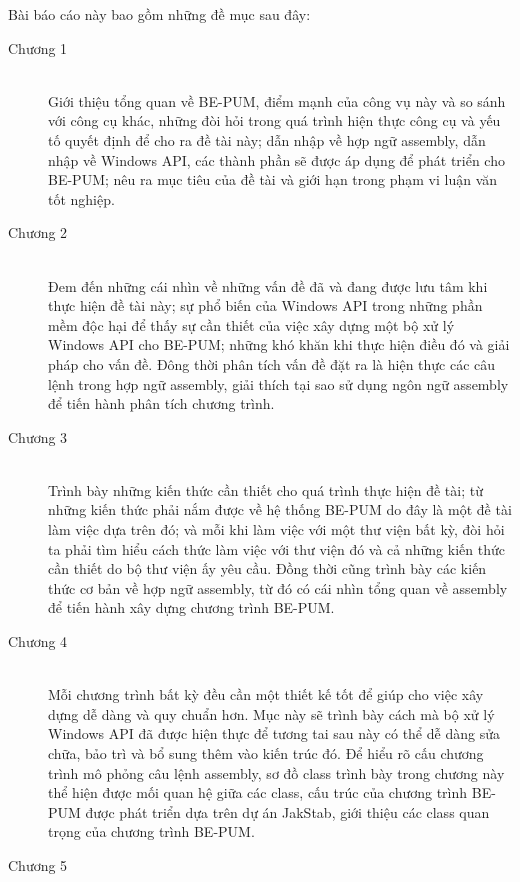 Bài báo cáo này bao gồm những đề mục sau đây:

\begin{description}
  	\item[Chương 1] \hfill \\
	Giới thiệu tổng quan về BE-PUM, điểm mạnh của công vụ này và so sánh với công cụ khác, những đòi hỏi trong quá trình hiện thực công cụ và yếu tố quyết  định để cho ra đề tài này; dẫn nhập về hợp ngữ assembly, dẫn nhập về Windows API, các thành phần sẽ được áp dụng để phát triển cho BE-PUM; nêu ra mục tiêu của đề tài và giới hạn trong phạm vi luận văn tốt nghiệp. \\
 	\item[Chương 2] \hfill \\
	Đem đến những cái nhìn về những vấn đề đã và đang được lưu tâm khi thực hiện đề tài này; sự phổ biến của Windows API trong những phần mềm độc hại để thấy sự cần thiết của việc xây dựng một bộ xử lý Windows API cho BE-PUM; những khó khăn khi thực hiện điều đó và giải pháp cho vấn đề. Đông thời phân tích vấn đề đặt ra là hiện thực các câu lệnh trong hợp ngữ assembly, giải thích tại sao sử dụng ngôn ngữ assembly để tiến hành phân tích chương trình.\\
	\item[Chương 3] \hfill \\
	Trình bày những kiến thức cần thiết cho quá trình thực hiện đề tài; từ những kiến thức phải nắm được về hệ thống BE-PUM do đây là một đề tài làm việc dựa trên đó; và mỗi khi làm việc với một thư viện bất kỳ, đòi hỏi ta phải tìm hiểu cách thức làm việc với thư viện đó và cả những kiến thức cần thiết do bộ thư viện ấy yêu cầu. Đồng thời cũng trình bày các kiến thức cơ bản về hợp ngữ assembly, từ đó có cái nhìn tổng quan về assembly để tiến hành xây dựng chương trình BE-PUM. \\
	\item[Chương 4] \hfill \\
	Mỗi chương trình bất kỳ đều cần một thiết kế tốt để giúp cho việc xây dựng dễ dàng và quy chuẩn hơn. Mục này sẽ trình bày cách mà bộ xử lý Windows API đã được hiện thực để tương tai sau này có thể dễ dàng sửa chữa, bảo trì và bổ sung thêm vào kiến trúc đó. Để hiểu rõ cấu chương trình mô phỏng câu lệnh assembly, sơ đồ class trình bày trong chương này thể hiện được mối quan hệ giữa các class, cấu trúc của chương trình BE-PUM được phát triển dựa trên dự án JakStab, giới thiệu các class quan trọng của chương trình BE-PUM.\\
	\item[Chương 5] \hfill \\

\end{description}
